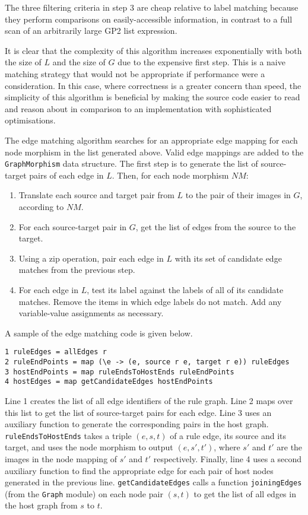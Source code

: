 The three filtering criteria in step 3 are cheap relative to label matching because they perform comparisons on easily-accessible information, in contrast to a full scan of an arbitrarily large GP2 list expression.

It is clear that the complexity of this algorithm increases exponentially with both the size of $L$ and the size of $G$ due to the expensive first step. This is a naive matching strategy that would not be appropriate if performance were a consideration. In this case, where correctness is a greater concern than speed, the simplicity of this algorithm is beneficial by making the source code easier to read and reason about in comparison to an implementation with sophisticated optimisations.

The edge matching algorithm searches for an appropriate edge mapping for each node morphism in the list generated above. Valid edge mappings are added to the \texttt{GraphMorphism} data structure. The first step is to generate the list of source-target pairs of each edge in $L$. Then, for each node morphism $NM$:

\begin{enumerate}
\item Translate each source and target pair from $L$ to the pair of their images in $G$, according to $NM$.
\item For each source-target pair in $G$, get the list of edges from the source to the target.
\item Using a zip operation, pair each edge in $L$ with its set of candidate edge matches from the previous step.
\item For each edge in $L$, test its label against the labels of all of its candidate matches. Remove the items in which edge labels do not match. Add any variable-value assignments as necessary.
\end{enumerate}

A sample of the edge matching code is given below.

\begin{verbatim}
1 ruleEdges = allEdges r
2 ruleEndPoints = map (\e -> (e, source r e, target r e)) ruleEdges
3 hostEndPoints = map ruleEndsToHostEnds ruleEndPoints
4 hostEdges = map getCandidateEdges hostEndPoints
\end{verbatim}

Line 1 creates the list of all edge identifiers of the rule graph. Line 2 maps over this list to get the list of source-target pairs for each edge. Line 3 uses an auxiliary function to generate the corresponding pairs in the host graph. \texttt{ruleEndsToHostEnds} takes a triple $(e, s, t)$ of a rule edge, its source and its target, and uses the node morphism to output $(e, s', t')$, where $s'$ and $t'$ are the images in the node mapping of $s'$ and $t'$ respectively. Finally, line 4 uses a second auxiliary function to find the appropriate edge for each pair of host nodes generated in the previous line. \texttt{getCandidateEdges} calls a function \texttt{joiningEdges} (from the \texttt{Graph} module) on each node pair $(s, t)$ to get the list of all edges in the host graph from $s$ to $t$. 


